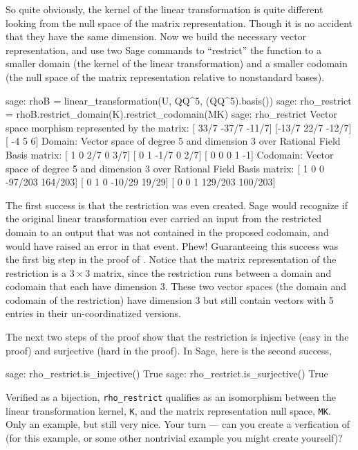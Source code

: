 %
So quite obviously, the kernel of the linear transformation is quite different looking from the null space of the matrix representation.  Though it is no accident that they have the same dimension.  Now we build the necessary vector representation, and use two Sage commands to ``restrict'' the function to a smaller domain (the kernel of the linear transformation) and a smaller codomain (the null space of the matrix representation relative to nonstandard bases).
%
\begin{sageexample}
sage: rhoB = linear_transformation(U, QQ^5, (QQ^5).basis())
sage: rho_restrict = rhoB.restrict_domain(K).restrict_codomain(MK)
sage: rho_restrict
Vector space morphism represented by the matrix:
[ 33/7 -37/7 -11/7]
[-13/7  22/7 -12/7]
[   -4     5     6]
Domain: Vector space of degree 5 and dimension 3 over Rational Field
Basis matrix:
[   1    0  2/7    0  3/7]
[   0    1 -1/7    0  2/7]
[   0    0    0    1   -1]
Codomain: Vector space of degree 5 and dimension 3 over Rational Field
Basis matrix:
[      1       0       0 -97/203 164/203]
[      0       1       0  -10/29   19/29]
[      0       0       1 129/203 100/203]
\end{sageexample}
%
The first success is that the restriction was even created.  Sage would recognize if the original linear transformation ever carried an input from the restricted domain to an output that was not contained in the proposed codomain, and would have raised an error in that event.  Phew!  Guaranteeing this success was the first big step in the proof of .  Notice that the matrix representation of the restriction is a $3\times 3$ matrix, since the restriction runs between a domain and codomain that each have dimension 3.  These two vector spaces (the domain and codomain of the restriction) have dimension 3 but still contain vectors with 5 entries in their un-coordinatized versions.\par
%
The next two steps of the proof show that the restriction is injective (easy in the proof) and surjective (hard in the proof).  In Sage, here is the second success,
%
\begin{sageexample}
sage: rho_restrict.is_injective()
True
sage: rho_restrict.is_surjective()
True
\end{sageexample}
%
Verified as a bijection, \verb?rho_restrict? qualifies as an isomorphism between the linear transformation kernel, \verb?K?, and the matrix representation null space, \verb?MK?.  Only an example, but still very nice.  Your turn --- can you create a verfication of  (for this example, or some other nontrivial example you might create yourself)?
%
\begin{sageverbatim}
\end{sageverbatim}
%








